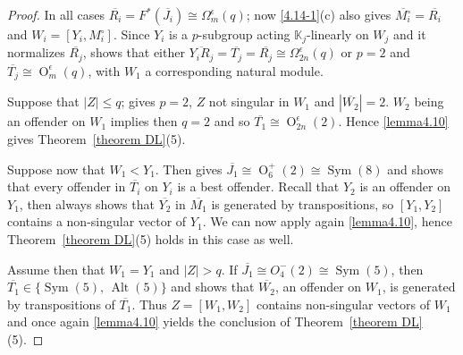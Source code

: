 \documentclass{amsart}
\numberwithin{equation}{section}
\theoremstyle{definition}
\theoremstyle{subresult}
\theoremstyle{caseresult}
\newcommand{\bK}{\mathbb{K}}
\newcommand{\Sym}{\operatorname{Sym}}
\newcommand{\Alt}{\operatorname{Alt}}
\renewcommand{\O}{\operatorname{O}}
\newcommand{\ov}{\overline}
\newcommand{\<}{\langle}
\renewcommand{\>}{\rangle}
\begin{document}
\begin{proof}
	In all cases $\ov{R_i} = F^*(\ov{J_i}) \cong \Omega_m^\epsilon(q)$; now \eqref{4.14-1}(c) also gives $\ov{M_i^\circ} = \ov{R_i}$ and $W_i=[Y_i,M_i^\circ]$. Since $Y_i$ is a $p$-subgroup acting $\bK_j$-linearly on $W_j$ and it normalizes $\ov{R_j}$, \cite[Lemma B-35(d)]{Meier-Stell-Stroth:2012} shows that either $\ov{Y_iR_j}=\ov{T_j}=\ov{R_j} \cong \Omega_{2n}^\epsilon(q)$ or $p=2$ and $\ov{T_j} \cong \O_m^\epsilon(q)$, with $W_1$ a corresponding natural module.
	
	Suppose that $|Z| \le q$; \cite[Lemma B.9(c)]{Meier-Stell-Stroth:2012} gives $p=2$, $Z$ not singular in $W_1$ and $|\ov{W_2}| =2$. $W_2$ being an offender on $W_1$ implies then $q=2$ and so $\ov{T_1} \cong \O_{2n}^\epsilon(2)$. Hence \ref{lemma4.10} gives Theorem~\ref{theorem DL}(5).
	
	Suppose now that $W_1 < Y_1$. Then \cite[Theorem C.22]{Meier-Stell-Stroth:2012} gives $\ov{J_1} \cong \O_6^+(2) \cong \Sym(8)$ and \cite[Theorem C.4(h)]{Meier-Stell-Stroth:2012} shows that every offender in $\ov{T_i}$ on $Y_i$ is a best offender. Recall that $Y_2$ is an offender on $Y_1$, then always \cite[Theorem C.22]{Meier-Stell-Stroth:2012} shows that $\ov{Y_2}$ in $\ov{M_1}$ is generated by transpositions, so $[Y_1,Y_2]$ contains a non-singular vector of $Y_1$. We can now apply again \ref{lemma4.10}, hence Theorem~\ref{theorem DL}(5) holds in this case as well.
	
	Assume then that $W_1=Y_1$ and $|Z| > q$. If $\ov{J_1} \cong O_4^-(2) \cong \Sym(5)$, then $\ov{T_1} \in \{\Sym(5), \, \Alt(5)\}$ and \cite[Theorem C.4(g)]{Meier-Stell-Stroth:2012} shows that $\ov{W_2}$, an offender on $W_1$, is generated by transpositions of $\ov{T_1}$. Thus $Z=[W_1,W_2]$ contains non-singular vectors of $W_1$ and once again \ref{lemma4.10} yields the conclusion of Theorem~\ref{theorem DL}(5).
	

\end{proof}
\end{document}
